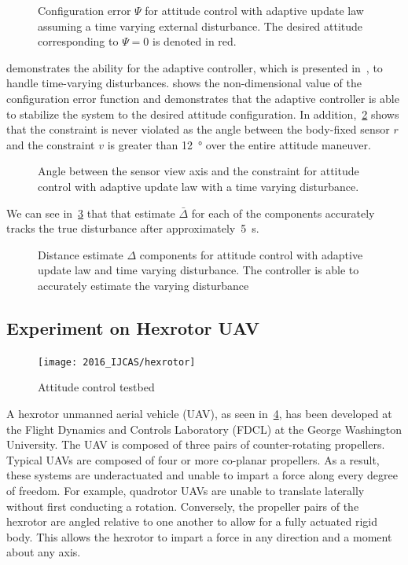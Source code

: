 \begin{figure}[htbp]
    \centering
    
    \caption{Configuration error \( \Psi \) for attitude control with adaptive update law assuming a time varying external disturbance.
    The desired attitude corresponding to \( \Psi = 0 \) is denoted in red.\label{fig:Psi_tv}}
\end{figure}
 demonstrates the ability for the adaptive controller, which is presented in~, to handle time-varying disturbances.
 shows the non-dimensional value of the configuration error function and demonstrates that the adaptive controller is able to stabilize the system to the desired attitude configuration.
In addition,~\cref{fig:con_angle_tv} shows that the constraint is never violated as the angle between the body-fixed sensor \( r \) and the constraint \( v \) is greater than \SI{12}{\degree} over the entire attitude maneuver.
\begin{figure}[htbp]
    \centering
    
    \caption{Angle between the sensor view axis and the constraint for attitude control with adaptive update law with a time varying disturbance. \label{fig:con_angle_tv}}
\end{figure}
We can see in~\cref{fig:Delta_tv} that that estimate \(\bar \Delta \) for each of the components accurately tracks the true disturbance after approximately~\SI{5}{\second}.
\begin{figure}[htbp]
    \centering
    
    \caption{Distance estimate \( \Delta \) components for attitude control with adaptive update law and time varying disturbance.
    The controller is able to accurately estimate the varying disturbance\label{fig:Delta_tv}}
\end{figure}

\subsection{Experiment on Hexrotor UAV}\label{sec:experiment}

\begin{figure}[htbp]
    \centering
    \texttt{[image: 2016\_IJCAS/hexrotor]}
    \caption{Attitude control testbed~\label{fig:hexrotor}}
\end{figure}
\vspace{-3mm}
A hexrotor unmanned aerial vehicle (UAV), as seen in~\cref{fig:hexrotor}, has been developed at the Flight Dynamics and Controls Laboratory (FDCL) at the George Washington University.
The UAV is composed of three pairs of counter-rotating propellers. 
Typical UAVs are composed of four or more co-planar propellers.
As a result, these systems are underactuated and unable to impart a force along every degree of freedom.
For example, quadrotor UAVs are unable to translate laterally without first conducting a rotation.
Conversely, the propeller pairs of the hexrotor are angled relative to one another to allow for a fully actuated rigid body.
This allows the hexrotor to impart a force in any direction and a moment about any axis. 

